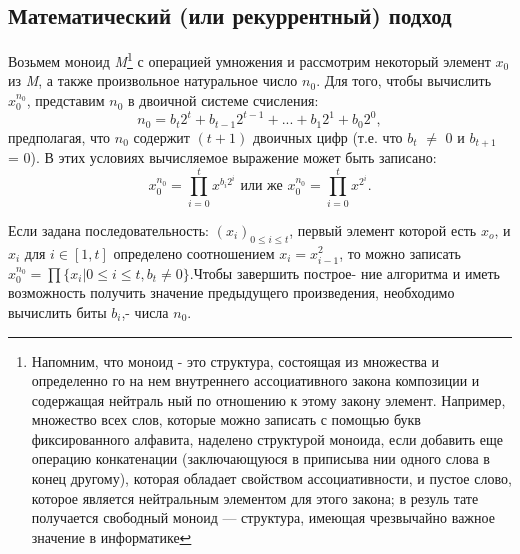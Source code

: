\subsection{ Математический (или рекуррентный) подход}
Возьмем моноид \textit{M}\footnote{ Напомним, что моноид - это структура, состоящая из множества и определенно­
го на нем внутреннего ассоциативного закона композиции и содержащая нейтраль­
ный по отношению к этому закону элемент. Например, множество всех слов, которые
можно записать с  помощью букв фиксированного алфавита, наделено структурой
моноида, если добавить еще операцию конкатенации (заключающуюся в приписыва­
нии одного слова в конец другому), которая обладает свойством ассоциативности, и
пустое слово, которое является нейтральным элементом для этого закона; в резуль­
тате  получается  свободный  моноид  —  структура, имеющая  чрезвычайно  важное
значение в информатике} с операцией умножения и рассмотрим некоторый 
элемент $x_0$ из \textit{M}, а также произвольное натуральное число $n_{0}$. Для того, 
чтобы вычислить $x_{0}^{n_{0}}$, представим $n_{0}$ в двоичной системе счисления:
\begin{equation*}
n_{0} = b_{t}2^{t} + b_{t - 1}2^{t - 1} + ... + b_{1}2^{1} + b_{0}2^{0},
\end{equation*}
предполагая, что $n_{0}$ содержит \textit{$(t + 1)$} двоичных цифр (т.е. что $b_{t}$ $\neq$ 0 и  \linebreak
$b_{t + 1}$ = 0). В этих условиях вычисляемое выражение может быть запи­сано:
\begin{equation*}
x_{0}^{n_{0}} = \prod_{i=0}^t x^{b_{i}2^{i}} \text{  или же  } x_{0}^{n_{0}} = \prod_{i=0}^t x^{2^{i}}.
\end{equation*}
\newline

Если задана последовательность: $(x_{i})_{0 \leqslant i \leqslant t}$, первый  элемент  которой 
\newline
есть $x_{o}$, и $x_{i}$ для \textit{$i \in [1,t]$} определено соотношением \textit{$x_{i} = x_{i-1}^2$}, то можно\linebreak
записать $x_{0}^{n_{0}} = \prod \{ x_{i} | 0 \leqslant i \leqslant t, b_{t} \neq 0\}$.Чтобы завершить построе-\linebreak
ние алгоритма и иметь возможность получить значение предыдущего\linebreak
произведения, необходимо вычислить биты $b_{i}$,- числа $n_{0}$.

